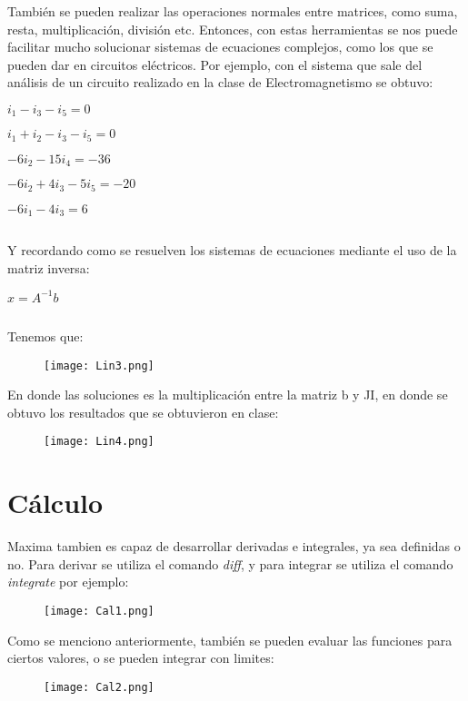 \documentclass[12pt]{article}
\begin{document}
\pagebreak

También se pueden realizar las operaciones normales entre matrices, como suma, resta, multiplicación, división etc. Entonces, con estas herramientas se nos puede facilitar mucho solucionar sistemas de ecuaciones complejos, como los que se pueden dar en circuitos eléctricos. Por ejemplo, con el sistema que sale del análisis de un circuito realizado en la clase de Electromagnetismo se obtuvo:

\centerline{$i_1 -i_3 -i_5 = 0$}
\centerline{$i_1 +i_2 -i_3 -i_5 = 0$}
\centerline{$-6i_2 -15i_4 = -36$}
\centerline{$-6i_2 + 4i_3 -5i_5 = -20$}
\centerline{$-6i_1 - 4i_3 = 6$}
$    $

Y recordando como se resuelven los sistemas de ecuaciones mediante el uso de la matriz inversa: \\

\centerline{$x = A^{-1} b$}
$     $

Tenemos que:

\begin{figure}[h!]
    \centering
\texttt{[image: Lin3.png]}
\end{figure}

En donde las soluciones es la multiplicación entre la matriz b y JI, en donde se obtuvo los resultados que se obtuvieron en clase:

\begin{figure}[h!]
    \centering
\texttt{[image: Lin4.png]}
\end{figure}

\section{Cálculo}
Maxima tambien es capaz de desarrollar derivadas e integrales, ya sea definidas o no. Para derivar se utiliza el comando \textit{diff}, y para integrar se utiliza el comando \textit{integrate} por ejemplo:

\begin{figure}[h!]
    \centering
\texttt{[image: Cal1.png]}
\end{figure}

\pagebreak

Como se menciono anteriormente, también se pueden evaluar las funciones para ciertos valores, o se pueden integrar con limites:

\begin{figure}[h!]
    \centering
\texttt{[image: Cal2.png]}
\end{figure}
\end{document}
